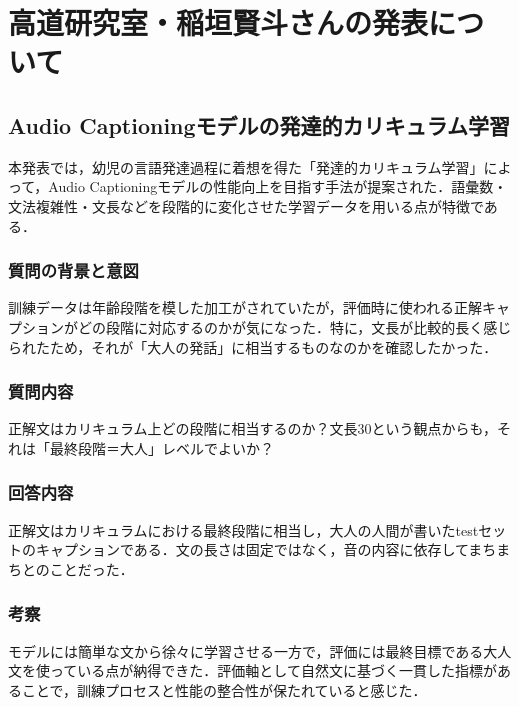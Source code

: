 \section{高道研究室・稲垣賢斗さんの発表について}

\subsection{Audio Captioningモデルの発達的カリキュラム学習}
本発表では，幼児の言語発達過程に着想を得た「発達的カリキュラム学習」によって，Audio Captioningモデルの性能向上を目指す手法が提案された．語彙数・文法複雑性・文長などを段階的に変化させた学習データを用いる点が特徴である．

\subsubsection{質問の背景と意図}
訓練データは年齢段階を模した加工がされていたが，評価時に使われる正解キャプションがどの段階に対応するのかが気になった．特に，文長が比較的長く感じられたため，それが「大人の発話」に相当するものなのかを確認したかった．

\subsubsection{質問内容}
正解文はカリキュラム上どの段階に相当するのか？文長30という観点からも，それは「最終段階＝大人」レベルでよいか？

\subsubsection{回答内容}
正解文はカリキュラムにおける最終段階に相当し，大人の人間が書いたtestセットのキャプションである．文の長さは固定ではなく，音の内容に依存してまちまちとのことだった．

\subsubsection{考察}
モデルには簡単な文から徐々に学習させる一方で，評価には最終目標である大人文を使っている点が納得できた．評価軸として自然文に基づく一貫した指標があることで，訓練プロセスと性能の整合性が保たれていると感じた．